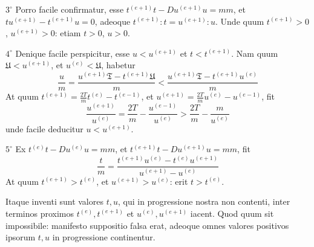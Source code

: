 \documentclass[12pt,a4paper]{article}
\theoremstyle{plain}
\theoremstyle{definition}
\theoremstyle{remark}
\begin{document}
$3^\circ$ Porro facile confirmatur, esse $t^{(e+1)}t-Du^{(e+1)}u=mm$, et $tu^{(e+1)}-t^{(e+1)}u=0$, adeoque $t^{(e+1)}:t=u^{(e+1)}:u$. Unde quum $t^{(e+1)}>0$, $u^{(e+1)}>0$: etiam $t>0$, $u>0$.

$4^\circ$ Denique facile perspicitur, esse $u<u^{(e+1)}$ et $t<t^{(e+1)}$. Nam quum $\mathfrak{U}<u^{(e+1)}$, et $u^{(e)}<\mathfrak{U}$, habetur
\[\frac{u}{m}=\frac{u^{(e+1)}\mathfrak{T}-t^{(e+1)}\mathfrak{U}}{m}<\frac{u^{(e+1)}\mathfrak{T}-t^{(e+1)}u^{(e)}}{m}\]
At quum $t^{(e+1)}=\frac{2T}{m}t^{(e)}-t^{(e-1)}$, et $u^{(e+1)}=\frac{2T}{m}u^{(e)}-u^{(e-1)}$, fit
\[\frac{u^{(e+1)}}{u^{(e)}}=\frac{2T}{m}-\frac{u^{(e-1)}}{u^{(e)}}>\frac{2T}{m}-\frac{m}{u^{(e)}}\]
unde facile deducitur $u<u^{(e+1)}$.

$5^\circ$ Ex $t^{(e)}t-Du^{(e)}u=mm$, et $t^{(e+1)}t-Du^{(e+1)}u=mm$, fit
\[\frac{t}{m}=\frac{t^{(e+1)}u^{(e)}-t^{(e)}u^{(e+1)}}{u^{(e+1)}-u^{(e)}}\]
At quum $t^{(e+1)}>t^{(e)}$, et $u^{(e+1)}>u^{(e)}$: erit $t>t^{(e)}$.

Itaque inventi sunt valores $t,u$, qui in progressione nostra non contenti, inter terminos proximos $t^{(e)},t^{(e+1)}$ et $u^{(e)},u^{(e+1)}$ iacent. Quod quum sit impossibile: manifesto suppositio falsa erat, adeoque omnes valores positivos ipsorum $t,u$ in progressione continentur.
\end{document}
